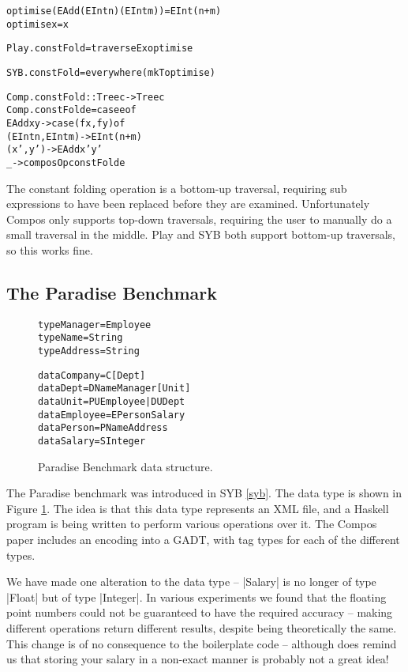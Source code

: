 \documentclass[preprint]{sigplanconf}
\newenvironment{code}{\begin{alltt}\small}{\end{alltt}}
\begin{document}
\begin{code}
optimise (EAdd (EInt n) (EInt m)) = EInt (n+m)
optimise x = x

Play.constFold = traverseEx optimise

SYB.constFold = everywhere (mkT optimise)

Comp.constFold :: Tree c -> Tree c
Comp.constFold e = case e of
    EAdd x y -> case  (f x, f y) of
                      (EInt n, EInt m) -> EInt (n+m)
                      (x',y') -> EAdd x' y'
    _ -> composOp constFold e
\end{code}

The constant folding operation is a bottom-up traversal, requiring sub expressions to have been replaced before they are examined. Unfortunately Compos only supports top-down traversals, requiring the user to manually do a small traversal in the middle. Play and SYB both support bottom-up traversals, so this works fine.


\subsection{The Paradise Benchmark}

\begin{figure}
\begin{code}
type Manager   = Employee
type Name      = String
type Address   = String

data Company   = C [Dept]
data Dept      = D Name Manager [Unit]
data Unit      = PU Employee | DU Dept
data Employee  = E Person Salary
data Person    = P Name Address
data Salary    = S Integer
\end{code}
\caption{Paradise Benchmark data structure.}
\label{fig:paradise}
\end{figure}

The Paradise benchmark was introduced in SYB \ref{syb}. The data type is shown in Figure \ref{fig:paradise}. The idea is that this data type represents an XML file, and a Haskell program is being written to perform various operations over it. The Compos paper includes an encoding into a GADT, with tag types for each of the different types.

We have made one alteration to the data type -- |Salary| is no longer of type |Float| but of type |Integer|. In various experiments we found that the floating point numbers could not be guaranteed to have the required accuracy -- making different operations return different results, despite being theoretically the same. This change is of no consequence to the boilerplate code -- although does remind us that storing your salary in a non-exact manner is probably not a great idea!
\end{document}
